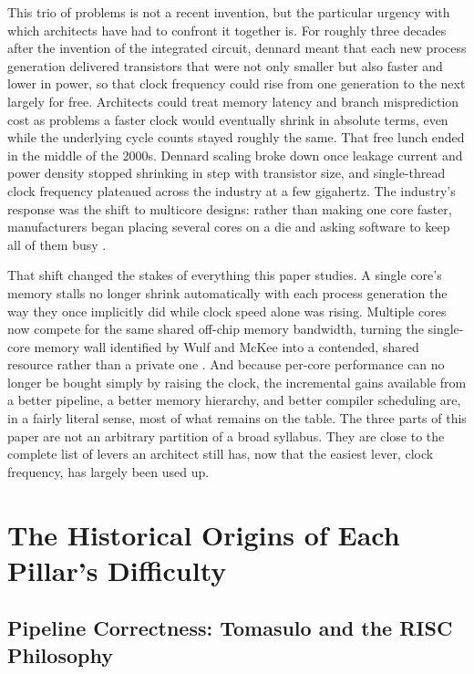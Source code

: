 \documentclass[12pt,a4paper]{report}
\begin{document}
This trio of problems is not a recent invention, but the particular
urgency with which architects have had to confront it together is. For
roughly three decades after the invention of the integrated circuit,
\gls{dennard} meant that each new process generation delivered
transistors that were not only smaller but also faster and lower in
power, so that clock frequency could rise from one generation to the
next largely for free. Architects could treat memory latency and branch
misprediction cost as problems a faster clock would eventually shrink in
absolute terms, even while the underlying cycle counts stayed roughly
the same. That free lunch ended in the middle of the 2000s. Dennard
scaling broke down once leakage current and power density stopped
shrinking in step with transistor size, and single-thread clock
frequency plateaued across the industry at a few gigahertz. The
industry's response was the shift to multicore designs: rather than
making one core faster, manufacturers began placing several cores on a
die and asking software to keep all of them busy \cite{esmaeilzadeh2011}.

That shift changed the stakes of everything this paper studies. A single
core's memory stalls no longer shrink automatically with each process
generation the way they once implicitly did while clock speed alone was
rising. Multiple cores now compete for the same shared off-chip memory
bandwidth, turning the single-core memory wall identified by Wulf and
McKee into a contended, shared resource rather than a private one
\cite{wulfmckee1995}. And because per-core performance can no longer be
bought simply by raising the clock, the incremental gains available from
a better pipeline, a better memory hierarchy, and better compiler
scheduling are, in a fairly literal sense, most of what remains on the
table. The three parts of this paper are not an arbitrary partition of a
broad syllabus. They are close to the complete list of levers an
architect still has, now that the easiest lever, clock frequency, has
largely been used up.

\section{The Historical Origins of Each Pillar's Difficulty}
\label{app:history-pillars}

\subsection{Pipeline Correctness: Tomasulo and the RISC Philosophy}
\end{document}

